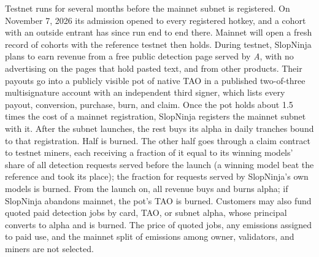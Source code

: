 Testnet runs for several months before the mainnet subnet is registered. On
November 7, 2026 its admission opened to every registered hotkey, and a cohort
with an outside entrant has since run end to end there. Mainnet will open a
fresh record of cohorts with the reference testnet then holds. During testnet,
SlopNinja plans to earn revenue from a free public detection page served by
\textit{A}, with no advertising on the pages that hold pasted text, and from
other products. Their payouts go into a publicly visible pot of native TAO in a
published two-of-three multisignature account with an independent third
signer, which lists every payout, conversion, purchase, burn, and claim. Once
the pot holds about 1.5 times the cost of a mainnet registration, SlopNinja
registers the mainnet subnet with it. After the subnet launches, the rest
buys its alpha in daily tranches bound to that registration. Half is burned.
The other half goes through a claim contract to testnet miners, each
receiving a fraction of it equal to its winning models' share of all
detection requests served before the launch (a winning model beat the
reference and took its place); the fraction for requests served by
SlopNinja's own models is burned. From the launch on, all revenue buys
and burns alpha; if SlopNinja abandons mainnet, the pot's TAO is burned. Customers
may also fund quoted paid detection jobs by card, TAO, or subnet alpha, whose
principal converts to alpha and is burned. The price of quoted jobs, any
emissions assigned to paid use, and the mainnet split of emissions among owner, validators, and
miners are not selected.
